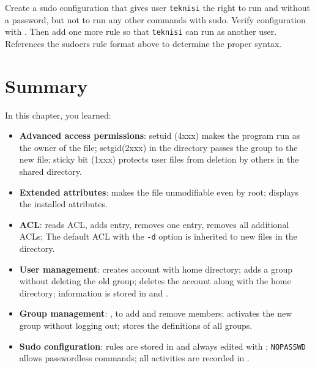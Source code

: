 \begin{challengebox}
Create a sudo configuration that gives user \texttt{teknisi} the right to run  and  without a password, but not to run any other commands with sudo. Verify configuration with . Then add one more rule so that \texttt{teknisi} can run  as another user. References the sudoers rule format above to determine the proper syntax.
\end{challengebox}

\section{Summary}
\label{sec:file-user-summary}

In this chapter, you learned:

\begin{itemize}[noitemsep,topsep=2pt]
\item \textbf{Advanced access permissions}: setuid (4xxx) makes the program run as the owner of the file; setgid(2xxx) in the directory passes the group to the new file; sticky bit (1xxx) protects user files from deletion by others in the shared directory.
\item \textbf{Extended attributes}:  makes the file unmodifiable even by root;  displays the installed attributes.
\item \textbf{ACL}:  reads ACL,  adds entry,  removes one entry,  removes all additional ACLs; The default ACL with the \texttt{-d} option is inherited to new files in the directory.
\item \textbf{User management}:  creates account with home directory;  adds a group without deleting the old group;  deletes the account along with the home directory; information is stored in  and .
\item \textbf{Group management}: ,  to add and remove members;  activates the new group without logging out;  stores the definitions of all groups.
\item \textbf{Sudo configuration}: rules are stored in  and always edited with ; \texttt{NOPASSWD} allows passwordless commands; all activities are recorded in .
\end{itemize}

